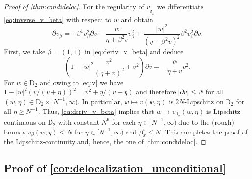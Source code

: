 \documentclass[10pt,a4paper]{amsart}
\newcommand{\abs}[1]{\left| #1 \right|}
\numberwithin{equation}{section}
\newcommand*\barr[1]{\overline{#1}}
\newcommand*\ubarr[1]{{\widehat{#1}}}
\begin{document}
\begin{proof}[Proof of \cref{thm:condideloc}]
		For the regularity of $v_{\ubarr{\beta}_x}$ we differentiate \cref{eq:inverse_v_beta} with respect to $w$ and obtain
		\begin{equation}\label{eq:deriv_v_beta}
			\partial v_{\beta} = - \beta^1 v_{\beta}^2 \partial v - \frac{\barr{w}}{\eta + \beta^2 v} v_{\beta}^2 + \frac{\abs{w}^2}{(\eta + \beta^2 v)^2}  \beta^{2} v_{\beta}^2 \partial v.
		\end{equation}
        First, we take $\beta = (1,1)$ in \cref{eq:deriv_v_beta} and deduce 
		\begin{equation*}
			\left( 1  - \abs{w}^2\frac{ v^2 }{(\eta+ v)^2} + v^2 \right) \partial v = -\frac{\barr{w}}{\eta + v} v^2.
		\end{equation*}
		For $w\in \mathrm{D}_2$  and owing to \cref{eq:v} we have $1 - \abs{w}^2\left( v/(v+ \eta)\right)^2 = v^2 + \eta/(v+\eta) $ and therefore
$\abs{ \partial v } \le N$ for all $(w, \eta) \in \mathrm{D}_2\times [N^{-1}, \infty)$. In particular, $w \mapsto  v(w,\eta)$ is $2N$-Lipschitz on $\mathrm{D}_2$ for all $\eta \geq N^{-1}$. Thus, \cref{eq:deriv_v_beta} implies that $w \mapsto v_{\beta_x}(w,\eta)$ is Lipschitz-continuous on $\mathrm{D}_2$ with constant $N^6$ for each $\eta \in [N^{-1},\infty)$ due to the (rough) bounds $v_{\beta}(w,\eta) \leq N$ for $\eta \in [N^{-1},\infty)$ and $\beta_x^i \leq N$. This completes the proof of the Lipschitz-continuity and, hence, the one of 
		\cref{thm:condideloc}. 
	\end{proof}
	
	\subsection{Proof of \cref{cor:delocalization_unconditional}} \label{sec:proof_cor_deloc_ER_graph} 
	
\end{document}
